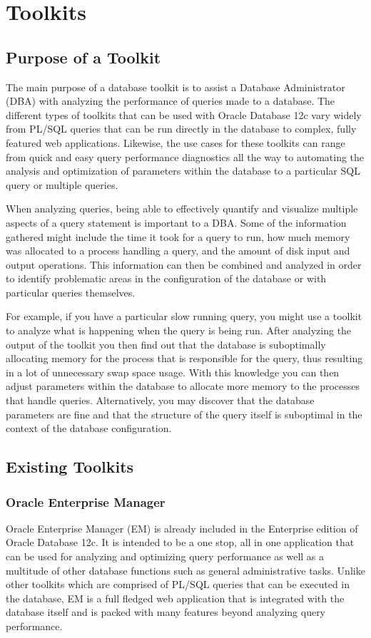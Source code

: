 \documentclass[draftclsnofoot, onecolumn, compsoc, 10pt]{IEEEtran}
\begin{document}

\section{Toolkits}
\subsection{Purpose of a Toolkit}
The main purpose of a database toolkit is to assist a Database Administrator (DBA) with analyzing the performance of queries made to a database. 
The different types of toolkits that can be used with Oracle Database 12c vary widely from PL/SQL queries that can be run directly in the database to complex, fully featured web applications. 
Likewise, the use cases for these toolkits can range from quick and easy query performance diagnostics all the way to automating the analysis and optimization of parameters within the database to a particular SQL query or multiple queries. 

When analyzing queries, being able to effectively quantify and visualize multiple aspects of a query statement is important to a DBA. 
Some of the information gathered might include the time it took for a query to run, how much memory was allocated to a process handling a query, and the amount of disk input and output operations. 
This information can then be combined and analyzed in order to identify problematic areas in the configuration of the database or with particular queries themselves. 

For example, if you have a particular slow running query, you might use a toolkit to analyze what is happening when the query is being run. 
After analyzing the output of the toolkit you then find out that the database is suboptimally allocating memory for the process that is responsible for the query, thus resulting in a lot of unnecessary swap space usage.
With this knowledge you can then adjust parameters within the database to allocate more memory to the processes that handle queries.
Alternatively, you may discover that the database parameters are fine and that the structure of the query itself is suboptimal in the context of the database configuration.

\subsection{Existing Toolkits}
\subsubsection{Oracle Enterprise Manager}
Oracle Enterprise Manager (EM) is already included in the Enterprise edition of Oracle Database 12c.
It is intended to be a one stop, all in one application that can be used for analyzing and optimizing query performance as well as a multitude of other database functions such as general administrative tasks. 
Unlike other toolkits which are comprised of PL/SQL queries that can be executed in the database, EM is a full fledged web application that is integrated with the database itself and is packed with many features beyond analyzing query performance. 
\end{document}
